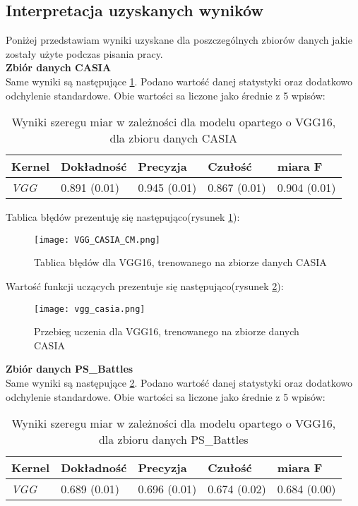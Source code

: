 \subsection{Interpretacja uzyskanych wyników}

Poniżej przedstawiam wyniki uzyskane dla poszczególnych zbiorów danych jakie zostały użyte podczas pisania pracy.\\

\textbf{Zbiór danych CASIA} \\

Same wyniki są następujące \ref{tab:result_vgg}. Podano wartość danej statystyki oraz dodatkowo odchylenie standardowe. Obie wartości sa liczone jako średnie z 5 wpisów:
\begin{table}[H]
	\centering
	\begin{tabular}{|l|l|l|l|l|}
		\hline
		\textbf{Kernel} & \textbf{Dokładność} & \textbf{Precyzja} & \textbf{Czułość} & \textbf{miara F} \\ \hline
		\textit{VGG}  & 0.891 (0.01) & 0.945 (0.01) & 0.867 (0.01) & 0.904 (0.01) \\ \hline
	\end{tabular}
	\caption{Wyniki szeregu miar w zależności dla modelu opartego o VGG16, dla zbioru danych CASIA}
	\label{tab:result_vgg}
\end{table}

Tablica błędów prezentuję się następująco(rysunek \ref{fig:vgg_cm_casia}):

\begin{figure}[H]
	\texttt{[image: VGG\_CASIA\_CM.png]}
	\centering
	\caption{Tablica błędów dla VGG16, trenowanego na zbiorze danych CASIA}
	\label{fig:vgg_cm_casia}
\end{figure}

Wartość funkcji uczących prezentuje się następująco(rysunek \ref{fig:vgg_learn_casia}):

\begin{figure}[H]
	\texttt{[image: vgg\_casia.png]}
	\centering
	\caption{Przebieg uczenia dla VGG16, trenowanego na zbiorze danych CASIA}
	\label{fig:vgg_learn_casia}
\end{figure}

\textbf{Zbiór danych PS\_Battles} \\

Same wyniki są następujące \ref{tab:result_p_vgg}. Podano wartość danej statystyki oraz dodatkowo odchylenie standardowe. Obie wartości sa liczone jako średnie z 5 wpisów:
\begin{table}[H]
	\centering
	\begin{tabular}{|l|l|l|l|l|}
		\hline
		\textbf{Kernel} & \textbf{Dokładność} & \textbf{Precyzja} & \textbf{Czułość} & \textbf{miara F} \\ \hline
		\textit{VGG}  & 0.689 (0.01) & 0.696 (0.01) & 0.674 (0.02) & 0.684 (0.00) \\ \hline
	\end{tabular}
	\caption{Wyniki szeregu miar w zależności dla modelu opartego o VGG16, dla zbioru danych PS\_Battles}
	\label{tab:result_p_vgg}
\end{table}

